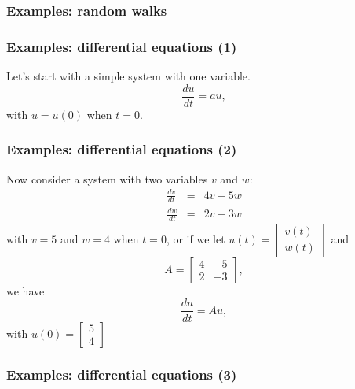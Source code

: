 


\begin{frame}
  \frametitle{Examples: random walks}
\end{frame}

\begin{frame}
  \frametitle{Examples: differential equations (1)}
  Let's start with a simple system with one variable.
  \[
  \frac{du}{dt} = au,
  \]
  with $u=u(0)$ when $t=0$.
  \vspace{2in}
\end{frame}

\begin{frame}
  \frametitle{Examples: differential equations (2)}
  Now consider a system with two variables $v$ and $w$:
  \[
  \begin{array}{lcr}
    \frac{dv}{dt} &=& 4v - 5w \\
    \frac{dw}{dt} &=& 2v - 3w
  \end{array}
  \]
  with $v=5$ and $w=4$ when $t=0$, \pause or if we let
  $u(t)=\begin{bmatrix}v(t)\\ w(t)\end{bmatrix}$ and
  \[
  A = \begin{bmatrix}
    4 & -5\\
    2 & -3
  \end{bmatrix},
  \]
  we have \[
  \frac{du}{dt} = Au,
  \]
  with $u(0) = \begin{bmatrix} 5 \\ 4 \end{bmatrix}$
\end{frame}

\begin{frame}
  \frametitle{Examples: differential equations (3)}
\end{frame}
